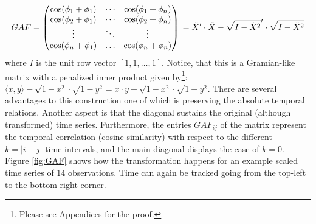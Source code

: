 \documentclass[11pt, a4paper]{article}
\begin{document}
\begin{equation}
\label{eq:GAF}
    GAF =\begin{pmatrix} 
\cos(\phi_1 + \phi_1) & \cdots & \cos(\phi_1 + \phi_n)\\
\cos(\phi_2 + \phi_1) & \cdots & \cos(\phi_2 + \phi_n)\\
\vdots & \ddots & \vdots\\
\cos(\phi_n + \phi_1) & \dots & \cos(\phi_n + \phi_n)\\
\end{pmatrix} \\
= \Tilde{X}' \cdot \Tilde{X} - \sqrt{I-\Tilde{X}^2}' \cdot \sqrt{I-\Tilde{X}^2}
\end{equation}
where $I$ is the unit row vector $[1, 1, \dots, 1]$. Notice, that this is a Gramian-like matrix with a penalized inner product given by\footnote{Please see Appendices  for the proof.}: $\langle x, y\rangle - \sqrt{1-x^2} \cdot \sqrt{1-y^2}= x \cdot y - \sqrt{1-x^2} \cdot \sqrt{1-y^2}$. There are several advantages to this construction one of which is preserving the absolute temporal relations. Another aspect is that the diagonal sustains the original (although transformed) time series. Furthermore, the entries $GAF_{ij}$ of the matrix represent the temporal correlation (cosine-similarity) with respect to the different $k= |i-j|$ time intervals, and the main diagonal displays the case of $k=0$. Figure \ref{fig:GAF} shows how the transformation happens for an example scaled time series of $14$ observations. Time can again be tracked going from the top-left to the bottom-right corner.
\end{document}
